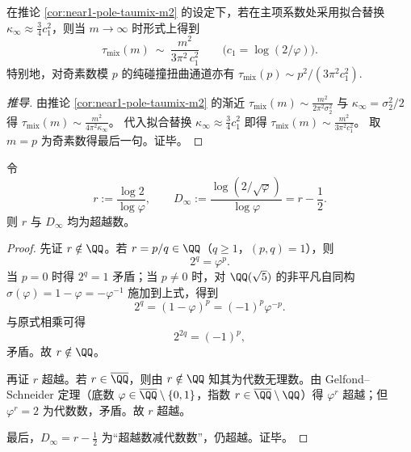 \begin{remark}\label{rem:near1-taumix-leading-coeff-from-c1}
在推论 \ref{cor:near1-pole-taumix-m2} 的设定下，若在主项系数处采用拟合替换 \(\kappa_\infty\approx \frac34 c_1^2\)，则当 \(m\to\infty\) 时形式上得到
\[
\tau_{\mathrm{mix}}(m)\ \sim\ \frac{m^2}{3\pi^2\,c_1^2}
\qquad\bigl(c_1=\log(2/\varphi)\bigr).
\]
特别地，对奇素数模 \(p\) 的纯碰撞扭曲通道亦有
\(
\tau_{\mathrm{mix}}(p)\sim {p^2}/{(3\pi^2c_1^2)}.
\)
\end{remark}
\begin{proof}[推导]
由推论 \ref{cor:near1-pole-taumix-m2} 的渐近
\(
\tau_{\mathrm{mix}}(m)\sim \frac{m^2}{2\pi^2\sigma_2^2}
\)
与 \(\kappa_\infty=\sigma_2^2/2\) 得
\(
\tau_{\mathrm{mix}}(m)\sim \frac{m^2}{4\pi^2\kappa_\infty}
\)。
代入拟合替换 \(\kappa_\infty\approx\frac34 c_1^2\) 即得
\(
\tau_{\mathrm{mix}}(m)\sim \frac{m^2}{3\pi^2c_1^2}
\)。
取 \(m=p\) 为奇素数得最后一句。证毕。
\end{proof}

\begin{proposition}\label{prop:near1-log2-over-logphi-Dinfty-transcendence-alt}
令
\[
r:=\frac{\log 2}{\log\varphi},
\qquad
D_\infty:=\frac{\log(2/\sqrt\varphi)}{\log\varphi}=r-\frac12.
\]
则 \(r\) 与 \(D_\infty\) 均为超越数。
\end{proposition}
\begin{proof}
先证 \(r\notin\QQ\)。若 \(r=p/q\in\QQ\)（\(q\ge 1\)，\((p,q)=1\)），则
\[
2^q=\varphi^p.
\]
当 \(p=0\) 时得 \(2^q=1\) 矛盾；当 \(p\neq 0\) 时，对 \(\QQ(\sqrt5)\) 的非平凡自同构 \(\sigma(\varphi)=1-\varphi=-\varphi^{-1}\) 施加到上式，得到
\[
2^q=(1-\varphi)^p=(-1)^p\varphi^{-p}.
\]
与原式相乘可得
\[
2^{2q}=(-1)^p,
\]
矛盾。故 \(r\notin\QQ\)。

再证 \(r\) 超越。若 \(r\in\overline{\QQ}\)，则由 \(r\notin\QQ\) 知其为代数无理数。由 Gelfond--Schneider 定理（底数 \(\varphi\in\overline{\QQ}\setminus\{0,1\}\)，指数 \(r\in\overline{\QQ}\setminus\QQ\)）得 \(\varphi^r\) 超越；但 \(\varphi^r=2\) 为代数数，矛盾。故 \(r\) 超越。

最后，\(D_\infty=r-\frac12\) 为“超越数减代数数”，仍超越。证毕。
\end{proof}

